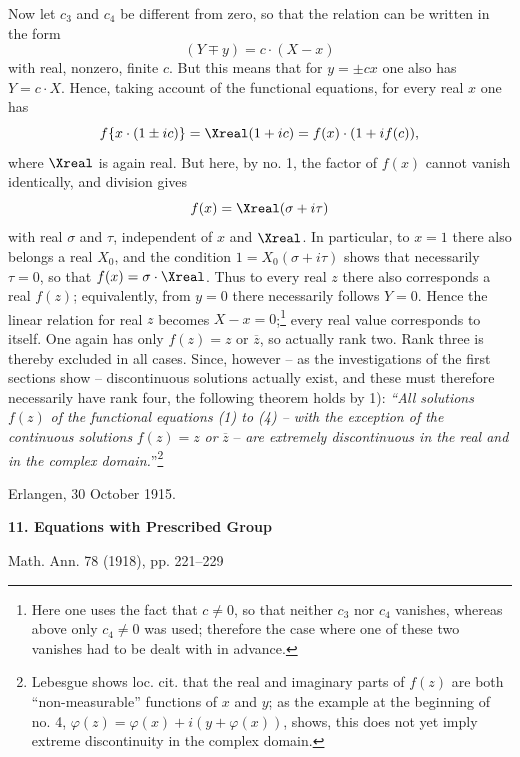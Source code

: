 \documentclass[11pt]{article}
\begin{document}
Now let \(c_3\) and \(c_4\) be different from zero, so that the relation can be written in the form
\[
(Y\mp y)=c\cdot(X-x)
\]
with real, nonzero, finite \(c\). But this means that for \(y=\pm cx\) one also has \(Y=c\cdot X\). Hence, taking account of the functional equations, for every real \(x\) one has
\[
f\{x\cdot(1\pm ic)\}=\Xreal(1+ic)=f(x)\cdot(1+i f(c)),
\]
where \(\Xreal\) is again real. But here, by no. 1, the factor of \(f(x)\) cannot vanish identically, and division gives
\[
f(x)=\Xreal(\sigma+i\tau)
\]
with real \(\sigma\) and \(\tau\), independent of \(x\) and \(\Xreal\). In particular, to \(x=1\) there also belongs a real \(X_0\), and the condition \(1=X_0(\sigma+i\tau)\) shows that necessarily \(\tau=0\), so that \(f(x)=\sigma\cdot\Xreal\). Thus to every real \(z\) there also corresponds a real \(f(z)\); equivalently, from \(y=0\) there necessarily follows \(Y=0\). Hence the linear relation for real \(z\) becomes \(X-x=0\);\footnote{Here one uses the fact that \(c\ne0\), so that neither \(c_3\) nor \(c_4\) vanishes, whereas above only \(c_4\ne0\) was used; therefore the case where one of these two vanishes had to be dealt with in advance.} every real value corresponds to itself. One again has only \(f(z)=z\) or \(\overline z\), so actually rank two. Rank three is thereby excluded in all cases. Since, however -- as the investigations of the first sections show -- discontinuous solutions actually exist, and these must therefore necessarily have rank four, the following theorem holds by 1): \emph{``All solutions} \(f(z)\) \emph{of the functional equations (1) to (4) -- with the exception of the continuous solutions} \(f(z)=z\) \emph{or} \(\overline z\) -- \emph{are extremely discontinuous in the real and in the complex domain.}''\footnote{Lebesgue shows loc. cit. that the real and imaginary parts of \(f(z)\) are both ``non-measurable'' functions of \(x\) and \(y\); as the example at the beginning of no. 4, \(\varphi(z)=\varphi(x)+i(y+\varphi(x))\), shows, this does not yet imply extreme discontinuity in the complex domain.}

\medskip
\noindent Erlangen, 30 October 1915.


\clearpage
\begin{center}
{\Large\bfseries 11. Equations with Prescribed Group}\par
\vspace{1.5em}
Math. Ann. 78 (1918), pp. 221--229
\end{center}

\vspace{4em}
\end{document}
